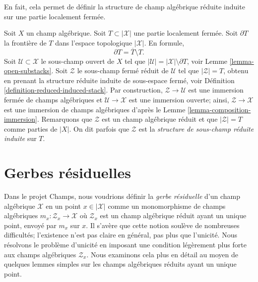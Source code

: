 \noindent
En fait, cela permet de définir la structure de champ algébrique réduite
induite sur une partie localement fermée.

\begin{remark}
\label{remark-stack-structure-locally-closed-subset}
Soit $X$ un champ algébrique.
Soit $T \subset |\mathcal{X}|$ une partie localement fermée.
Soit $\partial T$ la frontière de $T$ dans
l'espace topologique $|\mathcal{X}|$. En formule,
$$
\partial T = \overline{T} \setminus T.
$$
Soit $\mathcal{U} \subset \mathcal{X}$ le sous-champ ouvert de $X$ tel que
$|\mathcal{U}| = |\mathcal{X}| \setminus \partial T$, voir
Lemme \ref{lemma-open-substacks}.
Soit $\mathcal{Z}$ le sous-champ fermé réduit de $\mathcal{U}$ tel que
$|\mathcal{Z}| = T$, obtenu en prenant la structure réduite induite
de sous-espace fermé, voir
Définition \ref{definition-reduced-induced-stack}.
Par construction, $\mathcal{Z} \to \mathcal{U}$ est une immersion fermée de
champs algébriques et $\mathcal{U} \to \mathcal{X}$ est une immersion ouverte;
ainsi, $\mathcal{Z} \to \mathcal{X}$ est une immersion de champs algébriques d'après le
Lemme \ref{lemma-composition-immersion}.
Remarquons que $\mathcal{Z}$ est un champ algébrique réduit et que
$|\mathcal{Z}| = T$ comme parties de $|X|$. On dit parfois que
$\mathcal{Z}$ est la {\it structure de sous-champ réduite induite} sur $T$.
\end{remark}













\section{Gerbes résiduelles}
\label{section-residual-gerbe}

\noindent
Dans le projet Champs, nous voudrions définir la {\it gerbe résiduelle}
d'un champ algébrique $\mathcal{X}$ en un point $x \in |\mathcal{X}|$
comme un monomorphisme de champs algébriques
$m_x : \mathcal{Z}_x \to \mathcal{X}$ où $\mathcal{Z}_x$ est un champ
algébrique réduit ayant un unique point, envoyé par $m_x$ sur $x$.
Il s'avère que cette notion soulève de nombreuses difficultés; l'existence n'est pas
claire en général, pas plus que l'unicité.
Nous résolvons le problème d'unicité en imposant une condition légèrement plus forte
aux champs algébriques $\mathcal{Z}_x$.
Nous examinons cela plus en détail au moyen de quelques lemmes simples
sur les champs algébriques réduits ayant un unique point.

